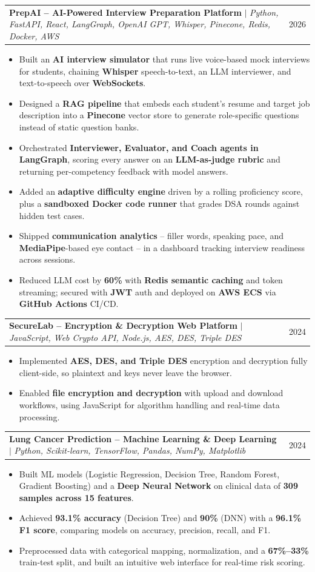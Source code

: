 \documentclass[letterpaper,11pt]{article}
\makeatletter
\newcommand{\resumeItem}[1]{
  \item\small{
    {#1 \vspace{-2pt}}
  }
}
\newcommand{\resumeProjectHeading}[2]{
    \item
    \begin{tabular*}{0.97\textwidth}{l@{\extracolsep{\fill}}r}
      \small#1 & #2 \\
    \end{tabular*}\vspace{-7pt}
}
\newcommand{\resumeItemListStart}{\begin{itemize}}
\newcommand{\resumeItemListEnd}{\end{itemize}\vspace{-5pt}}
\makeatother
\begin{document}
    \resumeProjectHeading
      {\textbf{PrepAI -- AI-Powered Interview Preparation Platform} $|$ \emph{Python, FastAPI, React, LangGraph, OpenAI GPT, Whisper, Pinecone, Redis, Docker, AWS}}{2026}
      \resumeItemListStart
        \resumeItem{Built an \textbf{AI interview simulator} that runs live voice-based mock interviews for students, chaining \textbf{Whisper} speech-to-text, an LLM interviewer, and text-to-speech over \textbf{WebSockets}.}
        \resumeItem{Designed a \textbf{RAG pipeline} that embeds each student's resume and target job description into a \textbf{Pinecone} vector store to generate role-specific questions instead of static question banks.}
        \resumeItem{Orchestrated \textbf{Interviewer, Evaluator, and Coach agents in LangGraph}, scoring every answer on an \textbf{LLM-as-judge rubric} and returning per-competency feedback with model answers.}
        \resumeItem{Added an \textbf{adaptive difficulty engine} driven by a rolling proficiency score, plus a \textbf{sandboxed Docker code runner} that grades DSA rounds against hidden test cases.}
        \resumeItem{Shipped \textbf{communication analytics} -- filler words, speaking pace, and \textbf{MediaPipe}-based eye contact -- in a dashboard tracking interview readiness across sessions.}
        \resumeItem{Reduced LLM cost by \textbf{60\%} with \textbf{Redis semantic caching} and token streaming; secured with \textbf{JWT} auth and deployed on \textbf{AWS ECS} via \textbf{GitHub Actions} CI/CD.}
      \resumeItemListEnd

    \resumeProjectHeading
      {\textbf{SecureLab -- Encryption \& Decryption Web Platform} $|$ \emph{JavaScript, Web Crypto API, Node.js, AES, DES, Triple DES}}{2024}
      \resumeItemListStart
        \resumeItem{Implemented \textbf{AES, DES, and Triple DES} encryption and decryption fully client-side, so plaintext and keys never leave the browser.}
        \resumeItem{Enabled \textbf{file encryption and decryption} with upload and download workflows, using JavaScript for algorithm handling and real-time data processing.}
      \resumeItemListEnd

    \resumeProjectHeading
      {\textbf{Lung Cancer Prediction -- Machine Learning \& Deep Learning} $|$ \emph{Python, Scikit-learn, TensorFlow, Pandas, NumPy, Matplotlib}}{2024}
      \resumeItemListStart
        \resumeItem{Built ML models (Logistic Regression, Decision Tree, Random Forest, Gradient Boosting) and a \textbf{Deep Neural Network} on clinical data of \textbf{309 samples across 15 features}.}
        \resumeItem{Achieved \textbf{93.1\% accuracy} (Decision Tree) and \textbf{90\%} (DNN) with a \textbf{96.1\% F1 score}, comparing models on accuracy, precision, recall, and F1.}
        \resumeItem{Preprocessed data with categorical mapping, normalization, and a \textbf{67\%--33\%} train-test split, and built an intuitive web interface for real-time risk scoring.}
      \resumeItemListEnd
\end{document}
